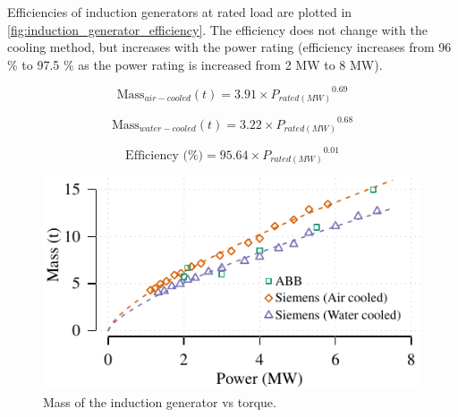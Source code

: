 \documentclass{article}\usepackage{graphicx, color}
\makeatletter
\def\maxwidth{ %
  \ifdim\Gin@nat@width>\linewidth
    \linewidth
  \else
    \Gin@nat@width
  \fi
}
\newenvironment{knitrout}{}{} %
\makeatother
\begin{document}
\vspace{6pt}

Efficiencies of induction generators at rated load are plotted in \autoref{fig:induction_generator_efficiency}. The efficiency does not change with the cooling method, but increases with the power rating (efficiency increases from 96 \% to 97.5 \% as the power rating is increased from 2 MW to 8 MW). 

\begin{equation}
  \text{Mass}_{air-cooled}(t) = 3.91 \times {P_{rated(MW)}}^{0.69}
  \label{mass-air}
\end{equation}

\begin{equation}
  \text{Mass}_{water-cooled}(t) = 3.22 \times {P_{rated(MW)}}^{0.68}
  \label{mass-water}
\end{equation}

\begin{equation}
\text{Efficiency (\%)} = 95.64 \times {P_{rated(MW)}}^{0.01}
\end{equation}


\begin{knitrout}
\color{fgcolor}\begin{figure}[]


{\centering \includegraphics[width=\maxwidth]{figure/induction_generator} 

}

\caption[Mass of the induction generator vs torque]{Mass of the induction generator vs torque.\label{fig:induction_generator}}
\end{figure}


\end{knitrout}
\end{document}
